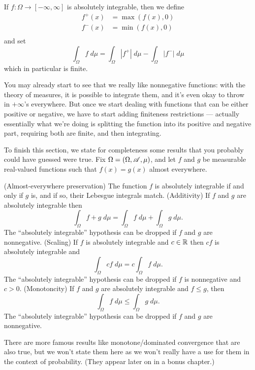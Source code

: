 \begin{step}
	If $f \colon \Omega \to [-\infty, \infty]$ is absolutely integrable,
	then we define
	\begin{align*}
		f^+(x) &= \max\left( f(x), 0 \right) \\
		f^-(x) &= \min\left( f(x), 0 \right) \\
	\end{align*}
	and set
	\[ \int_\Omega f \; d\mu = \int_\Omega |f^+| \; d\mu
		- \int_\Omega |f^-| \; d\mu \]
	which in particular is finite.
\end{step}
You may already start to see that we really like nonnegative functions:
with the theory of measures, it is possible to integrate them,
and it's even okay to throw in $+\infty$'s everywhere.
But once we start dealing with functions that can be either positive or negative,
we have to start adding finiteness restrictions ---
actually essentially what we're doing is splitting
the function into its positive and negative part,
requiring both are finite, and then integrating.


To finish this section, we state for completeness
some results that you probably could have guessed were true.
Fix $\Omega = (\Omega, \mathscr A, \mu)$, and
let $f$ and $g$ be measurable real-valued functions
such that $f(x) = g(x)$ almost everywhere.
\begin{itemize}
	\ii (Almost-everywhere preservation)
	The function $f$ is absolutely integrable if and only if $g$ is,
	and if so, their Lebesgue integrals match.
	\ii (Additivity)
	If $f$ and $g$ are absolutely integrable then
	\[ \int_\Omega f+g \; d\mu
		= \int_\Omega f \; d\mu
		+ \int_\Omega g \; d\mu. \]
	The ``absolutely integrable'' hypothesis can be dropped
	if $f$ and $g$ are nonnegative.
	\ii (Scaling) If $f$ is absolutely integrable and $c \in \mathbb R$
	then $cf$ is absolutely integrable and
	\[ \int_\Omega cf \; d\mu = c \int_\Omega f \; d\mu. \]
	The ``absolutely integrable'' hypothesis can be dropped
	if $f$ is nonnegative and $c > 0$.
	\ii (Monotoncity)
	If $f$ and $g$ are absolutely integrable and $f \le g$, then
	\[ \int_\Omega f \; d\mu \le \int_\Omega g \; d\mu. \]
	The ``absolutely integrable'' hypothesis can be dropped
	if $f$ and $g$ are nonnegative.
\end{itemize}
There are more famous results like monotone/dominated convergence
that are also true, but we won't state them here
as we won't really have a use for them in the context of probability.
(They appear later on in a bonus chapter.)

